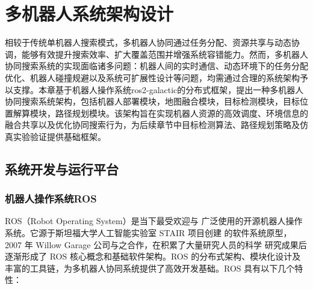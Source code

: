 \chapter{多机器人系统架构设计}
\label{chap:main}
相较于传统单机器人搜索模式，多机器人协同通过任务分配、资源共享与动态协调，能够有效提升搜索效率、扩大覆盖范围并增强系统容错能力。然而，多机器人协同搜索系统的实现面临诸多问题：机器人间的实时通信、动态环境下的任务分配优化、机器人碰撞规避以及系统可扩展性设计等问题，均需通过合理的系统架构予以支撑。本章基于机器人操作系统ros2-galactic的分布式框架，提出一种多机器人协同搜索系统架构，包括机器人部署模块，地图融合模块，目标检测模块，目标位置解算模块，路径规划模块。该架构旨在实现机器人资源的高效调度、环境信息的融合共享以及优化协同搜索行为，为后续章节中目标检测算法、路径规划策略及仿真实验验证提供基础框架。

\section{系统开发与运行平台}
\label{sec:font}
\subsection{机器人操作系统ROS}
ROS（Robot Operating System）是当下最受欢迎与
广泛使用的开源机器人操作系统。它源于斯坦福大学人工智能实验室 STAIR 项目创建
的软件系统原型，2007 年 Willow Garage 公司与之合作，在积累了大量研究人员的科学
研究成果后逐渐形成了 ROS 核心概念和基础软件架构。ROS 的分布式架构、模块化设计及丰富的工具链，为多机器人协同系统提供了高效开发基础。ROS 具有以下几个特性：

